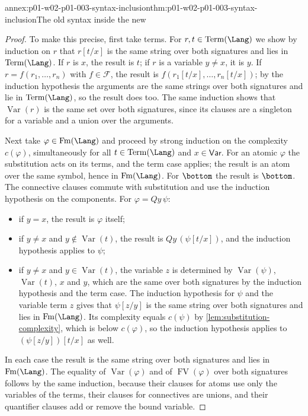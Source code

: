 \begin{annexitem}{annex:p01-w02-p01-003-syntax-inclusion}{thm:p01-w02-p01-003-syntax-inclusion}{The old syntax inside the new}
\begin{proof}
To make this precise, first take terms. For \(r,t\in\operatorname{Term}(\Lang)\)
we show by induction on \(r\) that \(r[t/x]\) is the same string over both
signatures and lies in \(\operatorname{Term}(\Lang)\). If \(r\) is \(x\), the
result is \(t\); if \(r\) is a variable \(y\ne x\), it is \(y\). If
\(r=f(r_1,\ldots,r_n)\) with \(f\in\mathcal F\), the result is
\(f(r_1[t/x],\ldots,r_n[t/x])\); by the induction hypothesis the arguments
are the same strings over both signatures and lie in
\(\operatorname{Term}(\Lang)\), so the result does too. The same induction
shows that \(\operatorname{Var}(r)\) is the same set over both signatures,
since its clauses are a singleton for a variable and a union over the
arguments.

Next take \(\varphi\in\operatorname{Fm}(\Lang)\) and proceed by strong
induction on the complexity \(c(\varphi)\), simultaneously for all
\(t\in\operatorname{Term}(\Lang)\) and \(x\in\mathsf{Var}\). For an atomic
\(\varphi\) the substitution acts on its terms, and the term case applies;
the result is an atom over the same symbol, hence in
\(\operatorname{Fm}(\Lang)\). For \(\bottom\) the result is \(\bottom\). The
connective clauses commute with substitution and use the induction
hypothesis on the components. For \(\varphi=Qy\,\psi\):
\begin{itemize}
  \item if \(y=x\), the result is \(\varphi\) itself;
  \item if \(y\ne x\) and \(y\notin\operatorname{Var}(t)\), the result is
        \(Qy\,(\psi[t/x])\), and the induction hypothesis applies to
        \(\psi\);
  \item if \(y\ne x\) and \(y\in\operatorname{Var}(t)\), the variable \(z\)
        is determined by \(\operatorname{Var}(\psi)\),
        \(\operatorname{Var}(t)\), \(x\) and \(y\), which are the same over
        both signatures by the induction hypothesis and the term case. The
        induction hypothesis for \(\psi\) and the variable term \(z\) gives
        that \(\psi[z/y]\) is the same string over both signatures and lies
        in \(\operatorname{Fm}(\Lang)\). Its complexity equals \(c(\psi)\)
        by \cref{lem:substitution-complexity}, which is below
        \(c(\varphi)\), so the induction hypothesis applies to
        \((\psi[z/y])[t/x]\) as well.
\end{itemize}
In each case the result is the same string over both signatures and lies in
\(\operatorname{Fm}(\Lang)\). The equality of \(\operatorname{Var}(\varphi)\)
and of \(\operatorname{FV}(\varphi)\) over both signatures follows by the same
induction, because their clauses for atoms use only the variables of the
terms, their clauses for connectives are unions, and their quantifier
clauses add or remove the bound variable.


\end{proof}
\end{annexitem}
